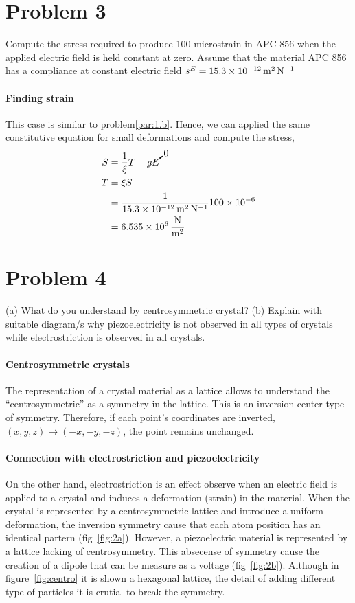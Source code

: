 \documentclass[../main.tex]{subfiles}
\begin{document}
\section{Problem 3}

Compute the stress required to produce 100 microstrain in APC 856 when the applied electric field is held constant at zero. 
Assume that the material APC 856 has a compliance at constant electric field $s^E=\SI{15.3d-12}{\meter\squared\per\newton}$

\paragraph{Finding strain} This case is similar to problem\ref{par:1.b}.
Hence, we can applied the same constitutive equation for small deformations and compute the stress,
\begin{align*}
    S &= \frac{1}{\xi}T + \cancelto{0}{g E} \\
    T &= \xi S \\
      &= \frac{1}{\SI{15.3d-12}{\meter\squared\per\newton}}\num{100d-6} \\
      &= \SI[per-mode=fraction]{6.535d6}{\newton\per\meter\squared}
\end{align*}


\section{Problem 4}

(a) What do you understand by centrosymmetric crystal? 
(b) Explain with suitable diagram/s why piezoelectricity is not observed in all types of crystals while electrostriction is observed in all crystals.

\paragraph{Centrosymmetric crystals} The representation of a crystal material as a lattice allows to understand the ``centrosymmetric'' as a symmetry in the lattice.
This is an inversion center type of symmetry.
Therefore, if each point's coordinates are inverted, $(x,y,z)\to(-x,-y,-z)$, the point remains unchanged.

\paragraph{Connection with electrostriction and piezoelectricity} 
On the other hand, electrostriction is an effect observe when an electric field is applied to a crystal and induces a deformation (strain) in the material.
When the crystal is represented by a centrosymmetric lattice and introduce a uniform deformation, the inversion symmetry cause that each atom position has an identical partern (fig~\ref{fig:2a}).
However, a piezoelectric material is represented by a lattice lacking of centrosymmetry.
This absecense of symmetry cause the creation of a dipole that can be measure as a voltage (fig~\ref{fig:2b}).
Although in figure~\ref{fig:centro} it is shown a hexagonal lattice, the detail of adding different type of particles it is crutial to break the symmetry.
\end{document}
